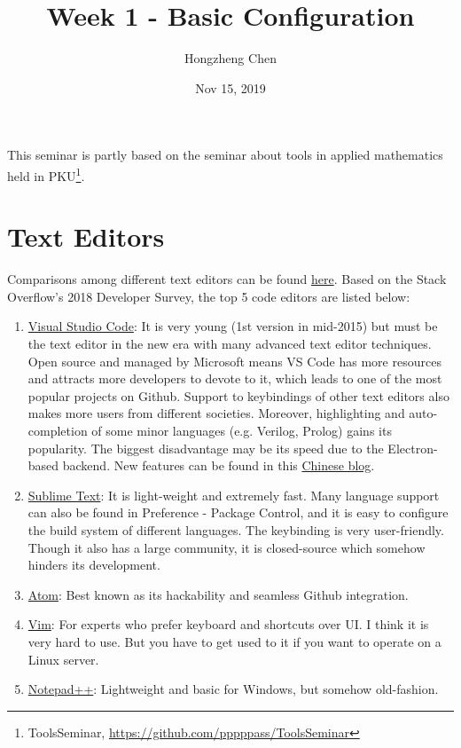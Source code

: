 \documentclass[english]{../TexTemplate/thesis}
\title{Week 1 - Basic Configuration}
\author{Hongzheng Chen}
\date{Nov 15, 2019}
\begin{document}
\maketitle

This seminar is partly based on the seminar about tools in applied mathematics held in PKU\footnote{ToolsSeminar, \url{https://github.com/pppppass/ToolsSeminar}}.

\section{Text Editors}
Comparisons among different text editors can be found \href{https://www.software.com/src/ranking-the-top-5-code-editors-2019}{here}.
Based on the Stack Overflow's 2018 Developer Survey, the top 5 code editors are listed below:
\begin{enumerate}
	\item \href{https://code.visualstudio.com/}{Visual Studio Code}: It is very young (1st version in mid-2015) but must be the text editor in the new era with many advanced text editor techniques.
	Open source and managed by Microsoft means VS Code has more resources and attracts more developers to devote to it, which leads to one of the most popular projects on Github.
	Support to keybindings of other text editors also makes more users from different societies.
	Moreover, highlighting and auto-completion of some minor languages (e.g. Verilog, Prolog) gains its popularity.
	The biggest disadvantage may be its speed due to the Electron-based backend.
	New features can be found in this \href{https://zhuanlan.zhihu.com/vs-code}{Chinese blog}.
	\item \href{https://www.sublimetext.com/}{Sublime Text}: It is light-weight and extremely fast.
	Many language support can also be found in Preference - Package Control, and it is easy to configure the build system of different languages.
	The keybinding is very user-friendly.
	Though it also has a large community, it is closed-source which somehow hinders its development.
	\item \href{https://atom.io/}{Atom}: Best known as its hackability and seamless Github integration.
	\item \href{https://www.vim.org/}{Vim}: For experts who prefer keyboard and shortcuts over UI.
	I think it is very hard to use.
	But you have to get used to it if you want to operate on a Linux server.
	\item \href{https://notepad-plus-plus.org/}{Notepad++}: Lightweight and basic for Windows, but somehow old-fashion.
\end{enumerate}
\end{document}

